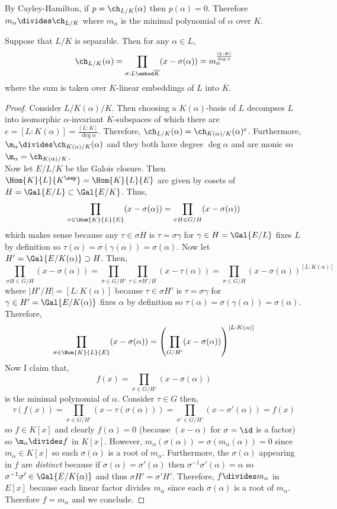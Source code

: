 \documentclass[12pt]{article}
\begin{document}
\begin{rmk}
By Cayley-Hamilton, if $p = \ch_{L/K}(\alpha)$ then $p(\alpha) = 0$. Therefore $m_\alpha \divides \ch_{L/K}$ where $m_\alpha$ is the minimal polynomial of $\alpha$ over $K$.
\end{rmk}

\begin{lemma}
Suppose that $L/K$ is separable. Then for any $\alpha \in L$,
\[ \ch_{L/K}(\alpha) = \prod_{\sigma : L \embed \overline{K}} (x - \sigma(\alpha)) = m_\alpha^{\frac{[L : K]}{\deg{\alpha}}} \]
where the sum is taken over $K$-linear embeddings of $L$ into $\overline{K}$.
\end{lemma}

\begin{proof}
Consider $L / K(\alpha) / K$. Then choosing a $K(\alpha)$-basis of $L$ decompses $L$ into isomorphic $\alpha$-invariant $K$-subspaces of which there are $e = [L : K(\alpha)] = \frac{[L : K]}{\deg{\alpha}}$. Therefore, $\ch_{L/K}(\alpha) = \ch_{K(\alpha)/K}(\alpha)^e$. Furthermore, $\m_\alpha \divides \ch_{K(\alpha)/K}(\alpha)$ and they both have degree $\deg{\alpha}$ and are monic so $\m_\alpha = \ch_{K(\alpha)/K}$. 
\bigskip\\
Now let $E / L / K$ be the Galois closure. Then $\Hom{K}{L}{K^\sep} = \Hom{K}{L}{E}$ are given by cosets of $H = \Gal{E/L} \subset \Gal{E/K}$. Thus,
\[ \prod_{\sigma \in \Hom{K}{L}{E}} (x - \sigma(\alpha)) = \prod_{\sigma H \in G/H}  (x - \sigma(\alpha)) \]
which makes sense because any $\tau \in \sigma H$ is $\tau = \sigma \gamma$ for $\gamma \in H = \Gal{E/L}$ fixes $L$ by definition so $\tau(\alpha) = \sigma(\gamma(\alpha)) = \sigma(\alpha)$. Now let $H' = \Gal{E/K(\alpha)} \supset H$. Then,
\[ \prod_{\sigma H \in G/H}  (x - \sigma(\alpha)) = \prod_{\sigma \in G/H'} \prod_{\tau \in \sigma H'/H} (x - \tau(\alpha)) = \prod_{\sigma \in G/H} (x - \sigma(\alpha))^{[L : K(\alpha)]} \]
where $|H'/H| = [L : K(\alpha)]$ because $\tau \in \sigma H'$ is $\tau = \sigma \gamma$ for $\gamma \in H' = \Gal{E/K(\alpha)}$ fixes $\alpha$ by definition so $\tau(\alpha) = \sigma(\gamma(\alpha)) = \sigma(\alpha)$. Therefore, 
\[ \prod_{\sigma \in \Hom{K}{L}{E}} (x - \sigma(\alpha)) = \left( \prod_{G/H'} (x - \sigma(\alpha)) \right)^{[L : K(\alpha)]} \]
Now I claim that,
\[ f(x) = \prod_{\sigma \in G/H'} (x - \sigma(\alpha)) \]
is the minimal polynomial of $\alpha$. Consider $\tau \in G$ then,
\[ \tau(f(x)) = \prod_{\sigma \in G/H'}(x - \tau(\sigma(\alpha))) = \prod_{\sigma' \in G/H'}(x - \sigma'(\alpha)) = f(x) \]
so $f \in K[x]$ and clearly $f(\alpha) = 0$ (because $(x - \alpha)$ for $\sigma = \id$ is a factor) so $\m_\alpha \divides f$ in $K[x]$. However, $m_\alpha(\sigma(\alpha)) = \sigma(m_\alpha(\alpha)) = 0$ since $m_\alpha \in K[x]$ so each $\sigma(\alpha)$ is a root of $m_\alpha$. Furthermore, the $\sigma(\alpha)$ appearing in $f$ are \textit{distinct} because if $\sigma(\alpha) = \sigma'(\alpha)$ then $\sigma^{-1} \sigma'(\alpha) = \alpha$ so $\sigma^{-1} \sigma' \in \Gal{E/K(\alpha)}$ and thus $\sigma H' = \sigma' H'$. Therefore, $f \divides m_\alpha$ in $E[x]$ because each linear factor divides $m_\alpha$ since each $\sigma(\alpha)$ is a root of $m_\alpha$. Therefore $f = m_\alpha$ and we conclude.
\end{proof}
\end{document}
